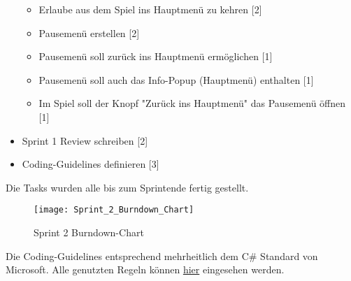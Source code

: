 \documentclass[../main.tex]{subfiles}
\begin{document}
\begin{itemize}
		\begin{itemize}
			\item Erlaube aus dem Spiel ins Hauptmenü zu kehren [2]
			\item Pausemenü erstellen [2]
			\item Pausemenü soll zurück ins Hauptmenü ermöglichen [1]
			\item Pausemenü soll auch das Info-Popup (Hauptmenü) enthalten [1]
			\item Im Spiel soll der Knopf "Zurück ins Hauptmenü" das Pausemenü öffnen [1]
		\end{itemize}
		\item Sprint 1 Review schreiben [2]
		\item Coding-Guidelines definieren [3]
	\end{itemize}

	\par Die Tasks wurden alle bis zum Sprintende fertig gestellt.
	
	\begin{figure}[H]
		\centering
		\texttt{[image: Sprint\_2\_Burndown\_Chart]}
		\caption{Sprint 2 Burndown-Chart}
	\end{figure}

	\par Die Coding-Guidelines entsprechend mehrheitlich dem C\# Standard von Microsoft. Alle genutzten Regeln können \href{https://github.com/ktaranov/naming-convention/blob/master/C#Coding Standards and Naming Conventions.md}{hier} eingesehen werden.
\end{document}

